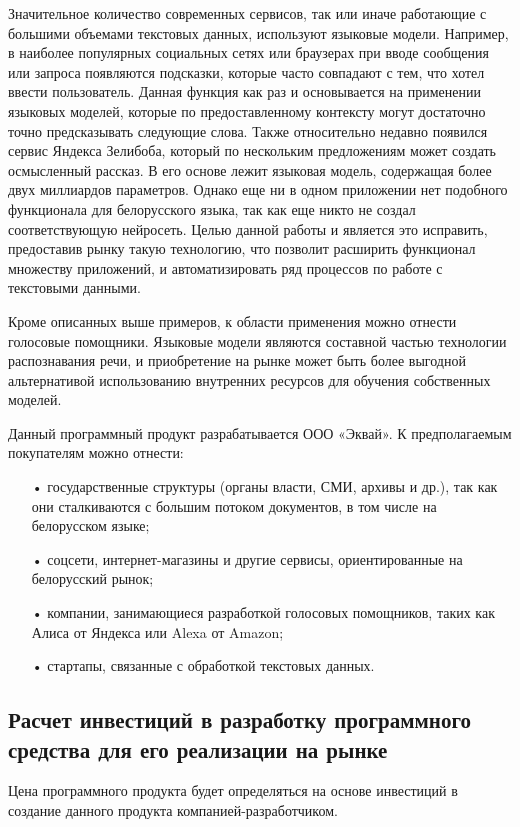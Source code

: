 Значительное количество современных сервисов, так или иначе работающие с большими объемами текстовых данных, используют языковые модели. Например, в наиболее популярных социальных сетях или браузерах при вводе сообщения или запроса появляются подсказки, которые часто совпадают с тем, что хотел ввести пользователь. Данная функция как раз и основывается на применении языковых моделей, которые по предоставленному контексту могут достаточно точно предсказывать следующие слова.
Также относительно недавно появился сервис Яндекса Зелибоба, который по нескольким предложениям может создать осмысленный рассказ. В его основе лежит языковая модель, содержащая более двух миллиардов параметров. Однако еще ни в одном приложении нет подобного функционала для белорусского языка, так как еще никто не создал соответствующую нейросеть. Целью данной работы и является это исправить, предоставив рынку такую технологию, что позволит расширить функционал множеству приложений, и автоматизировать ряд процессов по работе с текстовыми данными.

Кроме описанных выше примеров, к области применения можно отнести голосовые помощники. Языковые модели являются составной частью технологии распознавания речи, и приобретение на рынке может быть более выгодной альтернативой использованию внутренних ресурсов для обучения собственных моделей.

Данный программный продукт разрабатывается ООО «Эквай». К предполагаемым покупателям можно отнести:
\begin{itemize}
	\item[•] государственные структуры (органы власти, СМИ, архивы и др.), так как они сталкиваются с большим потоком документов, в том числе на белорусском языке;
	\item[•] соцсети, интернет-магазины и другие сервисы, ориентированные на белорусский рынок;
	\item[•] компании, занимающиеся разработкой голосовых помощников, таких как Алиса от Яндекса или Alexa от Amazon;
	\item[•] стартапы, связанные с обработкой текстовых данных.
\end{itemize}

\subsection{Расчет инвестиций в разработку программного средства для его реализации на рынке}

Цена программного продукта будет определяться на основе инвестиций в создание данного продукта компанией-разработчиком.

